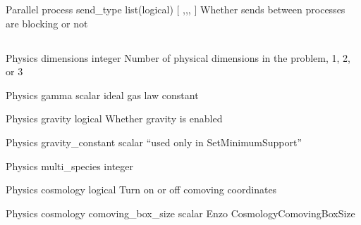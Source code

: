 \documentclass{article}
\begin{document}
\Parameter
{Parallel}
{process}
{send\_type}
{list(logical)}
{ [ ,,, ]}
{ Whether sends between processes are blocking or not}
{}
{}

\subsection{}

 	 	 	 	
\Parameter
{Physics}
{}
{dimensions}
{integer}
{}
{Number of physical dimensions in the problem, 1, 2, or 3}
{}
{}

\Parameter
{Physics}
{}
{gamma}
{scalar}
{}
{ideal gas law constant}
{}
{}

\Parameter
{Physics}
{}
{gravity}
{logical}
{}
{Whether gravity is enabled}
{}
{}

\Parameter
{Physics}
{}
{gravity\_constant}
{scalar}
{}
{``used only in SetMinimumSupport''}
{}
{}

\Parameter
{Physics}
{}
{multi\_species}
{integer}
{}
{}
{}
{}

\Parameter
{Physics}
{}
{cosmology}
{logical}
{}
{Turn on or off comoving coordinates}
{}
{}

\Parameter
{Physics}
{cosmology}
{comoving\_box\_size}
{scalar}
{}
{Enzo CosmologyComovingBoxSize}
{}
{}
 	 	 	 	
\end{document}
